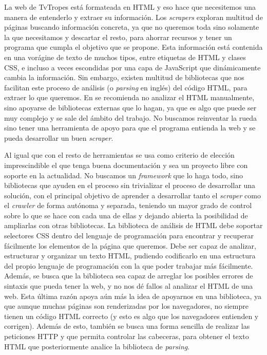 La web de TvTropes está formateada en HTML y eso hace que necesitemos una manera
de entenderlo y extraer su información. Los \textit{scrapers} exploran multitud
de páginas buscando información concreta, ya que no queremos toda sino
solamente la que necesitamos y descartar el resto, para ahorrar recursos y tener
un programa que cumpla el objetivo que se propone. Esta información está
contenida en una vorágine de texto de muchos tipos, entre etiquetas de HTML y
clases CSS, e incluso a veces escondidas por una capa de JavaScript que
dinámicamente cambia la información. Sin embargo, existen multitud de
bibliotecas que nos facilitan este proceso de análisis (o \textit{parsing} en
inglés) del código HTML, para extraer lo que queremos. En
\cite{apress2018scraping} se recomienda no analizar el HTML manualmente, sino
apoyarse de bibliotecas externas que lo hagan, ya que es algo que puede ser muy
complejo y se sale del ámbito del trabajo. No buscamos reinventar la rueda sino
tener una herramienta de apoyo para que el programa entienda la web y se pueda
desarrollar un buen \textit{scraper}.

Al igual que con el resto de herramientas se usa como criterio de elección
imprescindible el que tenga buena documentación y sea un proyecto libre con
soporte en la actualidad. No buscamos un \textit{framework} que lo haga todo,
sino bibliotecas que ayuden en el proceso sin trivializar el proceso de
desarrollar una solución, con el principal objetivo de aprender a desarrollar
tanto el \textit{scraper} como el \textit{crawler} de forma autónoma y separada,
teniendo un mayor grado de control sobre lo que se hace con cada una de ellas y
dejando abierta la posibilidad de ampliarlas con otras bibliotecas. La
biblioteca de análisis de HTML debe soportar selectores CSS dentro del lenguaje
de programación para encontrar y recuperar fácilmente los elementos de la página
que queremos. Debe ser capaz de analizar, estructurar y organizar un texto HTML,
pudiendo codificarlo en una estructura del propio lenguaje de programación con
la que poder trabajar más fácilmente. Además, se busca que la biblioteca sea
capaz de arreglar los posibles errores de sintaxis que pueda tener la web, y no
nos dé fallos al analizar el HTML de una web. Esta última razón apoya aún más la
idea de apoyarnos en una biblioteca, ya que aunque muchas páginas son
renderizadas por los navegadores, no siempre tienen un código HTML correcto (y
esto es algo que los navegadores entienden y corrigen). Además de esto, también
se busca una forma sencilla de realizar las peticiones HTTP y que permita
controlar las cabeceras, para obtener el texto HTML que posteriormente analice
la biblioteca de \textit{parsing}.

